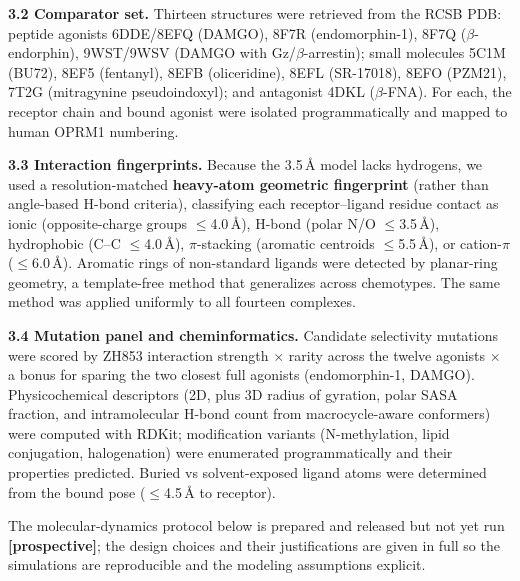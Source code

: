 \documentclass[11pt]{article}
\newcommand{\Ang}{\AA}
\newcommand{\bt}{$\beta$}
\newcommand{\pistack}{$\pi$}
\newcommand{\x}{$\times$}
\newcommand{\lteq}{$\le$}
\begin{document}
\textbf{3.2 Comparator set.} Thirteen structures were retrieved from the RCSB PDB: peptide agonists
6DDE/8EFQ (DAMGO), 8F7R (endomorphin-1), 8F7Q (\bt-endorphin), 9WST/9WSV (DAMGO with Gz/\bt-arrestin);
small molecules 5C1M (BU72), 8EF5 (fentanyl), 8EFB (oliceridine), 8EFL (SR-17018), 8EFO (PZM21), 7T2G
(mitragynine pseudoindoxyl); and antagonist 4DKL (\bt-FNA). For each, the receptor chain and bound
agonist were isolated programmatically and mapped to human OPRM1 numbering.

\textbf{3.3 Interaction fingerprints.} Because the 3.5\,\Ang{} model lacks hydrogens, we used a
resolution-matched \textbf{heavy-atom geometric fingerprint} (rather than angle-based H-bond criteria),
classifying each receptor--ligand residue contact as ionic (opposite-charge groups \lteq4.0\,\Ang),
H-bond (polar N/O \lteq3.5\,\Ang), hydrophobic (C--C \lteq4.0\,\Ang), \pistack-stacking (aromatic
centroids \lteq5.5\,\Ang), or cation-\pistack{} (\lteq6.0\,\Ang). Aromatic rings of non-standard ligands
were detected by planar-ring geometry, a template-free method that generalizes across chemotypes. The
same method was applied uniformly to all fourteen complexes.

\textbf{3.4 Mutation panel and cheminformatics.} Candidate selectivity mutations were scored by ZH853
interaction strength \x{} rarity across the twelve agonists \x{} a bonus for sparing the two closest
full agonists (endomorphin-1, DAMGO). Physicochemical descriptors (2D, plus 3D radius of gyration,
polar SASA fraction, and intramolecular H-bond count from macrocycle-aware conformers) were computed
with RDKit; modification variants (N-methylation, lipid conjugation, halogenation) were enumerated
programmatically and their properties predicted. Buried vs solvent-exposed ligand atoms were
determined from the bound pose (\lteq4.5\,\Ang{} to receptor).

The molecular-dynamics protocol below is prepared and released but not yet run
\textbf{[prospective]}; the design choices and their justifications are given in full so the
simulations are reproducible and the modeling assumptions explicit.
\end{document}
